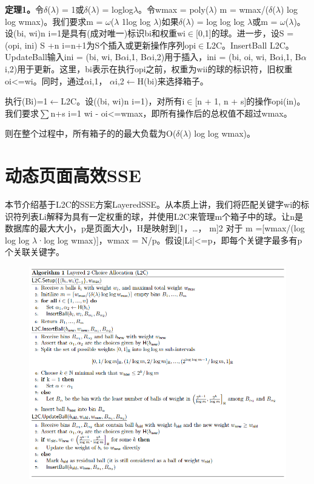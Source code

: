 \documentclass[UTF8]{article}
\begin{document}
\textbf{定理1。}令$\delta$($\lambda$) = 1或$\delta$($\lambda$) = loglog$\lambda$。令wmax = poly($\lambda$) m = wmax/($\delta$($\lambda$) log log wmax)。我们要求m = $\omega$($\lambda$ 1log log $\lambda$)如果$\delta$($\lambda$) = log log log $\lambda$或m = $\omega$($\lambda$)。设{(bi, wi)n i=1}是具有(成对唯一)标识bi和权重wi$\in$[0,1]的球。进一步，设S = (opi, ini) S +n i=n+1为S个插入或更新操作序列opi$\in${L2C。InsertBall L2C。UpdateBall}输入ini = (bi, wi, B$\alpha$i,1, B$\alpha$i,2)用于插入，ini = (bi, oi, wi, B$\alpha$i,1, B$\alpha$i,2)用于更新。这里，bi表示在执行opi之前，权重为wii的球的标识符，旧权重oi<=wi。同时，通过$\alpha$i,1， $\alpha$i,2$\leftarrow$H(bi)来选择箱子。

执行(Bi)=1$\leftarrow$L2C。设({(bi, wi)n i=1})，对所有i$\in$[n + 1, n + s]的操作opi(in)。我们要求$\sum$n+s i=1 wi - oi<=wmax，即所有操作后的总权值不超过wmax。

则在整个过程中，所有箱子的的最大负载为O($\delta$($\lambda$) log log wmax)。
\section{动态页面高效SSE}
本节介绍基于L2C的SSE方案LayeredSSE。从本质上讲，我们将匹配关键字wi的标识符列表Li解释为具有一定权重的球，并使用L2C来管理m个箱子中的球。让n是数据库的最大大小，p是页面大小，H是映射到[1，…， m]2 对于 m =[wmax/(log log log $\lambda$·log log wmax)]，wmax = N/p。假设|Li|<=p，即每个关键字最多有p个关联关键字。

\begin{figure}[ht]
  \centering
  \includegraphics[scale=0.5]{table3.png}
  \label{table3}
\end{figure}
\end{document}

